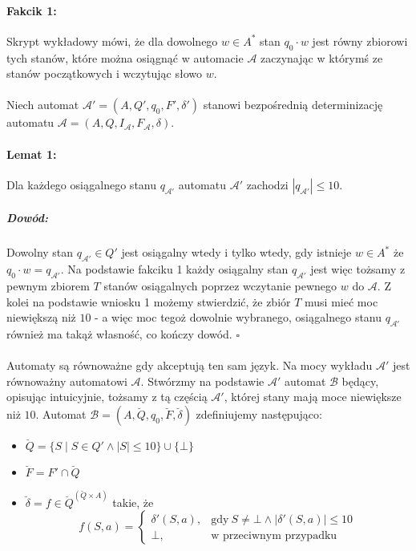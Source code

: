 \documentclass[12pt]{article}
\newcommand*{\Autom}{\mathcal{A}}
\newcommand*{\QEDB}{\hfill\ensuremath{\square}}%
\begin{document}
\paragraph{Fakcik 1:}
Skrypt wykładowy mówi, że dla dowolnego $w \in A^*$ stan $q_0 \cdot w$ jest równy zbiorowi tych
stanów, które można osiągnąć w automacie $\Autom$ zaczynając w którymś ze stanów początkowych i
wczytując słowo $w$.

\paragraph{}
Niech automat $\Autom' = (A, Q', q_0, F', \delta')$ stanowi bezpośrednią determinizację
automatu $\Autom = (A, Q, I_\Autom, F_\Autom, \delta)$. 

\paragraph{Lemat 1:} Dla każdego osiągalnego stanu $q_{\Autom'}$ automatu $\Autom'$ zachodzi
${|q_{\Autom'}| \leq 10}$.
\subparagraph{Dowód:} 
Dowolny stan $q_{\Autom'} \in Q'$ jest osiągalny wtedy i tylko wtedy, gdy istnieje $w \in A^*$ że
$q_0 \cdot w = q_{\Autom'}$. Na podstawie fakciku 1 każdy osiągalny stan $q_{\Autom'}$ jest więc
tożsamy z pewnym zbiorem $T$ stanów osiągalnych poprzez wczytanie pewnego $w$ do $\Autom$.
Z kolei na podstawie wniosku 1 możemy stwierdzić, że zbiór $T$ musi mieć moc niewiększą niż $10$
- a więc moc tegoż dowolnie wybranego, osiągalnego stanu $q_{\Autom'}$ również ma takąż własność,
co kończy dowód. \QEDB

\paragraph{}
Automaty są równoważne gdy akceptują ten sam język. Na mocy wykładu $\Autom'$ jest równoważny
automatowi $\Autom$. Stwórzmy na podstawie $\Autom'$ automat $\mathcal{B}$ będący, opisując
intuicyjnie, tożsamy z tą częścią $\Autom'$, której stany mają moce niewiększe niż $10$. Automat
$\mathcal{B} = (A, \breve Q, q_0, \breve F, \breve\delta)$ zdefiniujemy następująco:
\begin{itemize}
  \item $\breve Q = \{S \mid S \in Q' \land |S| \leq 10\} \cup \{\bot\}$
  \item $\breve F = F' \cap \breve Q$
  \item $\breve\delta = f \in \breve Q ^{(\breve Q \times A)}$ takie, że
	$$f(S, a) = \begin{cases}
	    \delta'(S, a), & \text{gdy}\ S \neq \bot \land |\delta'(S, a)| \leq 10 \\
	    \bot, & \text{w przeciwnym przypadku}
        \end{cases}$$
\end{itemize}
\end{document}
